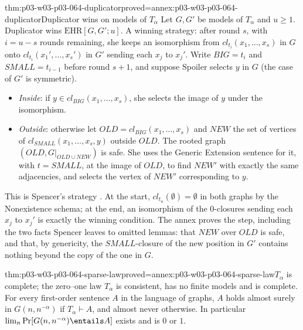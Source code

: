 \begin{hbtheorem}{thm:p03-w03-p03-064-duplicator}{proved=annex:p03-w03-p03-064-duplicator}{Duplicator wins on models of \(T_\alpha\)}
Let \(G,G'\) be models of \(T_\alpha\) and \(u\geq1\).  Duplicator wins
\(\mathrm{EHR}[G,G';u]\).  A winning strategy: after round \(s\), with
\(i=u-s\) rounds remaining, she keeps an isomorphism from
\(cl_{t_i}(x_1,\ldots,x_s)\) in \(G\) onto \(cl_{t_i}(x_1',\ldots,x_s')\) in
\(G'\) sending each \(x_j\) to \(x_j'\).  Write \(\mathit{BIG}=t_i\) and
\(\mathit{SMALL}=t_{i-1}\) before round \(s+1\), and suppose Spoiler selects
\(y\) in \(G\) (the case of \(G'\) is symmetric).
\begin{itemize}
\item \emph{Inside}: if \(y\in cl_{\mathit{BIG}}(x_1,\ldots,x_s)\), she
  selects the image of \(y\) under the isomorphism.
\item \emph{Outside}: otherwise let
  \(\mathit{OLD}=cl_{\mathit{BIG}}(x_1,\ldots,x_s)\) and \(\mathit{NEW}\) the
  set of vertices of \(cl_{\mathit{SMALL}}(x_1,\ldots,x_s,y)\) outside
  \(\mathit{OLD}\).  The rooted graph \((\mathit{OLD},G|_{\mathit{OLD}\cup
  \mathit{NEW}})\) is safe.  She uses the Generic Extension sentence for it,
  with \(t=\mathit{SMALL}\), at the image of \(\mathit{OLD}\), to find
  \(\mathit{NEW}'\) with exactly the same adjacencies, and selects the vertex
  of \(\mathit{NEW}'\) corresponding to \(y\).
\end{itemize}
\end{hbtheorem}

This is Spencer's strategy \cite[pp.~11--12]{Spencer2007LogicRandomStructuresAuthor}.
At the start, \(cl_{t_u}(\emptyset)=\emptyset\) in both graphs by the
Nonexistence schema; at the end, an isomorphism of the \(0\)-closures sending
each \(x_j\) to \(x_j'\) is exactly the winning condition.  The annex proves
the step, including the two facts Spencer leaves to omitted lemmas: that
\(\mathit{NEW}\) over \(\mathit{OLD}\) is safe, and that, by genericity, the
\(\mathit{SMALL}\)-closure of the new position in \(G'\) contains nothing
beyond the copy of the one in \(G\).

\begin{hbcorollary}{thm:p03-w03-p03-064-sparse-law}{proved=annex:p03-w03-p03-064-sparse-law}{\(T_\alpha\) is complete; the zero--one law}
\(T_\alpha\) is consistent, has no finite models and is complete.  For every
first-order sentence \(A\) in the language of graphs, \(A\) holds almost
surely in \(G(n,n^{-\alpha})\) if \(T_\alpha\vdash A\), and almost never
otherwise.  In particular \(\lim_n\Pr[G(n,n^{-\alpha})\entails A]\) exists
and is \(0\) or \(1\).
\end{hbcorollary}

